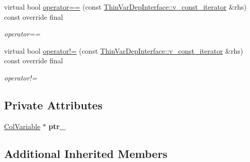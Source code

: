 \begin{DoxyCompactItemize}
\mbox{\label{class_s_m_spp__di__unipi__it_1_1_one_var_constraint_1_1v__const__iterator_a7a2398b23f78389d37cc9cc63cbc6d62}} 
virtual bool \mbox{\hyperlink{class_s_m_spp__di__unipi__it_1_1_one_var_constraint_1_1v__const__iterator_a7a2398b23f78389d37cc9cc63cbc6d62}{operator==}} (const \mbox{\hyperlink{class_s_m_spp__di__unipi__it_1_1_thin_var_dep_interface_1_1v__const__iterator}{Thin\+Var\+Dep\+Interface\+::v\+\_\+const\+\_\+iterator}} \&rhs) const override final
\begin{DoxyCompactList}\small\item\em operator== \end{DoxyCompactList}\item 
\mbox{\label{class_s_m_spp__di__unipi__it_1_1_one_var_constraint_1_1v__const__iterator_a08a734c5649070e449525025f48cbfcc}} 
virtual bool \mbox{\hyperlink{class_s_m_spp__di__unipi__it_1_1_one_var_constraint_1_1v__const__iterator_a08a734c5649070e449525025f48cbfcc}{operator!=}} (const \mbox{\hyperlink{class_s_m_spp__di__unipi__it_1_1_thin_var_dep_interface_1_1v__const__iterator}{Thin\+Var\+Dep\+Interface\+::v\+\_\+const\+\_\+iterator}} \&rhs) const override final
\begin{DoxyCompactList}\small\item\em operator!= \end{DoxyCompactList}\end{DoxyCompactItemize}
\subsection*{Private Attributes}
\begin{DoxyCompactItemize}
\item 
\mbox{\label{class_s_m_spp__di__unipi__it_1_1_one_var_constraint_1_1v__const__iterator_a2534d8407d94833f3a508b7e67ed14ee}} 
\mbox{\hyperlink{class_s_m_spp__di__unipi__it_1_1_col_variable}{Col\+Variable}} $\ast$ {\bfseries ptr\+\_\+}
\end{DoxyCompactItemize}
\subsection*{Additional Inherited Members}


